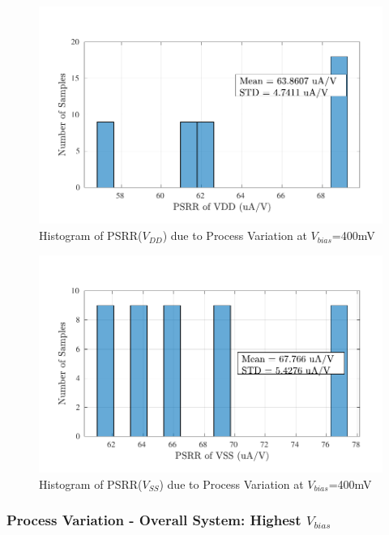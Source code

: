 \begin{figure} [H]
\centering
\includegraphics[scale=1]{Figures/Corners/Overall/Proc_Mid/PDFs/Proc_Mid_psrrp.pdf}
\caption{Histogram of PSRR($V_{DD}$) due to Process Variation at $V_{bias}$=400mV}
\end{figure}

\begin{figure} [H]
\centering
\includegraphics[scale=1]{Figures/Corners/Overall/Proc_Mid/PDFs/Proc_Mid_psrrn.pdf}
\caption{Histogram of PSRR($V_{SS}$) due to Process Variation at $V_{bias}$=400mV}
\end{figure}

\subsubsection{Process Variation - Overall System: Highest $V_{bias}$}

